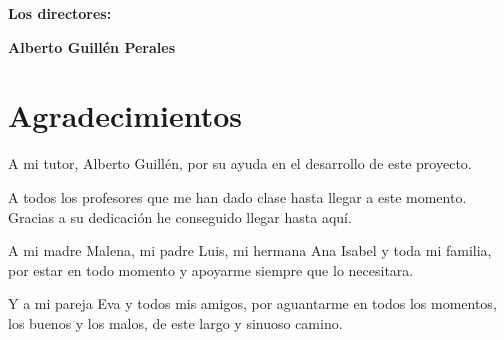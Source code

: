 \vspace{1cm}

\textbf{Los directores:}

\vspace{5cm}

\noindent \textbf{Alberto Guillén Perales}

\chapter*{Agradecimientos}
\thispagestyle{empty}

    \vspace{1cm}

A mi tutor, Alberto Guillén, por su ayuda en el desarrollo de este proyecto.

A todos los profesores que me han dado clase hasta llegar a este momento. Gracias a su dedicación he conseguido llegar
hasta aquí.

A mi madre Malena, mi padre Luis, mi hermana Ana Isabel y toda mi familia, por estar en todo momento y apoyarme siempre
que lo necesitara.

Y a mi pareja Eva y todos mis amigos, por aguantarme en todos los momentos, los buenos y los malos, de este largo y
sinuoso camino.
